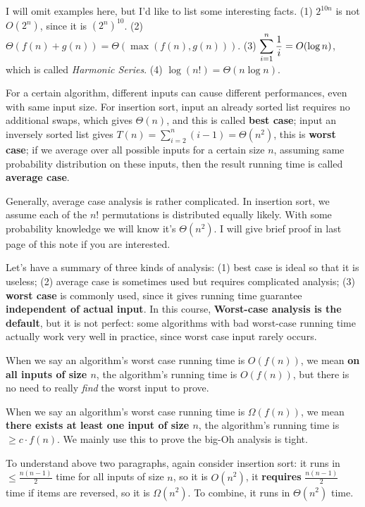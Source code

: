 \documentclass[11pt, a4paper]{COMP3711}
\begin{document}
\begin{spacing}{1.5}
    I will omit examples here, but I'd like to list some interesting facts.
    (1) $2^{10n}$ is not $O(2^n)$, since it is $(2^n)^{10}$. 
    (2) $\Theta (f(n)+g(n))=\Theta(\max(f(n), g(n)))$.
    (3) $\displaystyle \sum_{i=1}^{n}\frac{1}{i}=O(\log n)$, which is 
    called {\it Harmonic Series}.
    (4) $\log(n!)=\Theta (n\log n)$.

    For a certain algorithm, different inputs can cause different
    performances, even with same input size.
    For insertion sort, input an already sorted list requires
    no additional swaps, which gives $\Theta(n)$, and this is 
    called {\bf best case}; input an inversely sorted list
    gives $T(n)=\sum_{i=2}^{n}(i-1)=\Theta(n^2)$, this is 
    {\bf worst case}; if we average over all possible inputs
    for a certain size $n$, assuming same probability distribution
    on these inputs, then the result running time is called 
    {\bf average case}.

    Generally, average case analysis is rather complicated.
    In insertion sort, we assume each of the $n!$ permutations
    is distributed equally likely. With some probability 
    knowledge we will know it's $\Theta(n^2)$. I will 
    give brief proof in last page of this note if you are interested.

    Let's have a summary of three kinds of analysis: 
    (1) best case is ideal so that it is useless;
    (2) average case is sometimes used but requires
    complicated analysis; 
    (3) {\bf worst case} is commonly used, since it gives 
    running time guarantee {\bf independent of actual input}.
    In this course, {\bf Worst-case analysis is the default},
    but it is not perfect: some algorithms with bad worst-case 
    running time actually work very well in practice, 
    since worst case input rarely occurs.

    When we say an algorithm’s worst case running time is $O(f(n))$,
    we mean {\bf on all inputs of size $n$}, the algorithm’s 
    running time is $O(f(n))$, but there is no need to really 
    {\it find} the worst input to prove.

    When we say an algorithm’s worst case running time is $\Omega(f(n))$,
    we mean {\bf there exists at least one input of size $n$}, the algorithm’s 
    running time is $\ge c\cdot f(n)$. We mainly use this to prove 
    the big-Oh analysis is tight.

    To understand above two paragraphs, again consider insertion
    sort: it runs in $\le \frac{n(n-1)}{2}$ time for all inputs 
    of size $n$, so it is $O(n^2)$, it {\bf requires} 
    $\frac{n(n-1)}{2}$ time if items are reversed, 
    so it is $\Omega(n^2)$. To combine, it runs in $\Theta(n^2)$ time.


\end{spacing}
\end{document}
